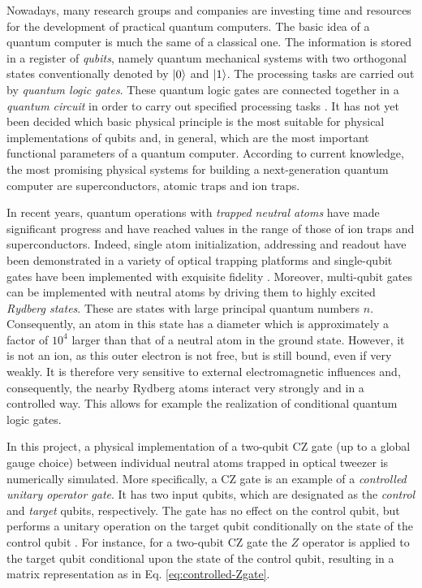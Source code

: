 \documentclass[rmp,10pt,onecolumn,fleqn,notitlepage]{revtex4-1}
\begin{document}
Nowadays, many research groups and companies are investing time and resources for the development of practical quantum computers.
The basic idea of a quantum computer is much the same of a classical one. The information is stored in a register of \textit{qubits}, namely quantum mechanical systems with two orthogonal states conventionally denoted by $\left\vert{0}\right\rangle$ and $\left\vert{1}\right\rangle$.
The processing tasks are carried out by \textit{quantum logic gates}. These quantum logic gates are connected together in a \textit{quantum circuit} in order to carry out specified processing tasks \cite{10.5555/1200964}.
It has not yet been decided which basic physical principle is the most suitable for physical implementations of qubits and, in general, which are the most important functional parameters of a quantum computer. According to current knowledge, the most promising physical systems for building a next-generation quantum computer are superconductors, atomic traps and ion traps.

In recent years, quantum operations with \textit{trapped neutral atoms} have made significant progress and have reached values in the range of those of ion traps and superconductors.
Indeed, single atom initialization, addressing and readout have been demonstrated in a variety of optical trapping platforms and single-qubit gates have been implemented with exquisite fidelity \cite{PhysRevLett.123.170503}.
Moreover, multi-qubit gates can be implemented with neutral atoms by driving them to highly excited \textit{Rydberg states}.
These are states with large principal quantum numbers $n$.
Consequently, an atom in this state has a diameter which is approximately a factor of $10^4$ larger than that of a neutral atom in the ground state. However, it is not an ion, as this outer electron is not free, but is still bound, even if very weakly.
It is therefore very sensitive to external electromagnetic influences and, consequently, the nearby Rydberg atoms interact very strongly and in a controlled way. This allows for example the realization of conditional quantum logic gates.

In this project, a physical implementation \cite{PhysRevLett.123.170503} of a two-qubit CZ gate (up to a global gauge choice) between individual neutral atoms trapped in optical tweezer is numerically simulated. More specifically, a CZ gate is an example of a \textit{controlled unitary operator gate}. It has two input qubits, which are designated as the \textit{control} and \textit{target} qubits, respectively. The gate has no effect on the control qubit, but performs a unitary operation on the target qubit conditionally on the state of the control qubit \cite{Fox:1001868}. For instance, for a two-qubit CZ gate the $Z$ operator is applied to the target qubit conditional upon the state of the control qubit, resulting in a matrix representation as in Eq. \eqref{eq:controlled-Zgate}.
\end{document}
